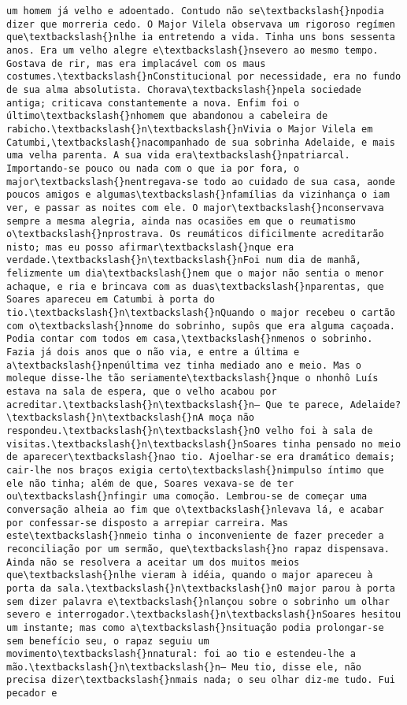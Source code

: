 \documentclass[11pt]{article}
\begin{document}
\begin{Verbatim}[commandchars=\\\{\}]
um homem já velho e adoentado. Contudo não se\textbackslash{}npodia dizer que morreria cedo. O Major Vilela observava um rigoroso regímen que\textbackslash{}nlhe ia entretendo a vida. Tinha uns bons sessenta anos. Era um velho alegre e\textbackslash{}nsevero ao mesmo tempo. Gostava de rir, mas era implacável com os maus costumes.\textbackslash{}nConstitucional por necessidade, era no fundo de sua alma absolutista. Chorava\textbackslash{}npela sociedade antiga; criticava constantemente a nova. Enfim foi o último\textbackslash{}nhomem que abandonou a cabeleira de rabicho.\textbackslash{}n\textbackslash{}nVivia o Major Vilela em Catumbi,\textbackslash{}nacompanhado de sua sobrinha Adelaide, e mais uma velha parenta. A sua vida era\textbackslash{}npatriarcal. Importando-se pouco ou nada com o que ia por fora, o major\textbackslash{}nentregava-se todo ao cuidado de sua casa, aonde poucos amigos e algumas\textbackslash{}nfamílias da vizinhança o iam ver, e passar as noites com ele. O major\textbackslash{}nconservava sempre a mesma alegria, ainda nas ocasiões em que o reumatismo o\textbackslash{}nprostrava. Os reumáticos dificilmente acreditarão nisto; mas eu posso afirmar\textbackslash{}nque era verdade.\textbackslash{}n\textbackslash{}nFoi num dia de manhã, felizmente um dia\textbackslash{}nem que o major não sentia o menor achaque, e ria e brincava com as duas\textbackslash{}nparentas, que Soares apareceu em Catumbi à porta do tio.\textbackslash{}n\textbackslash{}nQuando o major recebeu o cartão com o\textbackslash{}nnome do sobrinho, supôs que era alguma caçoada. Podia contar com todos em casa,\textbackslash{}nmenos o sobrinho. Fazia já dois anos que o não via, e entre a última e a\textbackslash{}npenúltima vez tinha mediado ano e meio. Mas o moleque disse-lhe tão seriamente\textbackslash{}nque o nhonhô Luís estava na sala de espera, que o velho acabou por acreditar.\textbackslash{}n\textbackslash{}n— Que te parece, Adelaide?\textbackslash{}n\textbackslash{}nA moça não respondeu.\textbackslash{}n\textbackslash{}nO velho foi à sala de visitas.\textbackslash{}n\textbackslash{}nSoares tinha pensado no meio de aparecer\textbackslash{}nao tio. Ajoelhar-se era dramático demais; cair-lhe nos braços exigia certo\textbackslash{}nimpulso íntimo que ele não tinha; além de que, Soares vexava-se de ter ou\textbackslash{}nfingir uma comoção. Lembrou-se de começar uma conversação alheia ao fim que o\textbackslash{}nlevava lá, e acabar por confessar-se disposto a arrepiar carreira. Mas este\textbackslash{}nmeio tinha o inconveniente de fazer preceder a reconciliação por um sermão, que\textbackslash{}no rapaz dispensava. Ainda não se resolvera a aceitar um dos muitos meios que\textbackslash{}nlhe vieram à idéia, quando o major apareceu à porta da sala.\textbackslash{}n\textbackslash{}nO major parou à porta sem dizer palavra e\textbackslash{}nlançou sobre o sobrinho um olhar severo e interrogador.\textbackslash{}n\textbackslash{}nSoares hesitou um instante; mas como a\textbackslash{}nsituação podia prolongar-se sem benefício seu, o rapaz seguiu um movimento\textbackslash{}nnatural: foi ao tio e estendeu-lhe a mão.\textbackslash{}n\textbackslash{}n— Meu tio, disse ele, não precisa dizer\textbackslash{}nmais nada; o seu olhar diz-me tudo. Fui pecador e 
\end{Verbatim}
\end{document}
